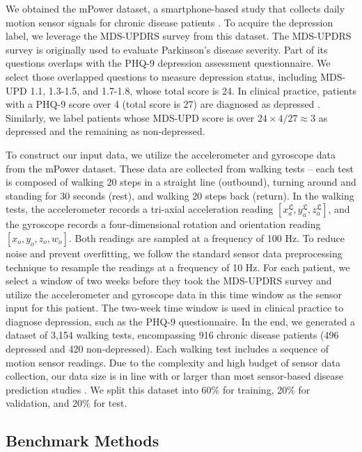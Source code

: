 \documentclass[mnsc]{informs3b} %
\begin{document}
We obtained the mPower dataset, a smartphone-based study that collects daily motion sensor signals for chronic disease patients \citep{bot_mpower_2016}. To acquire the depression label, we leverage the MDS-UPDRS survey from this dataset. The MDS-UPDRS survey is originally used to evaluate Parkinson's disease severity. Part of its questions overlaps with the PHQ-9 depression assessment questionnaire. We select those overlapped questions to measure depression status, including MDS-UPD 1.1, 1.3-1.5, and 1.7-1.8, whose total score is 24. In clinical practice, patients with a PHQ-9 score over 4 (total score is 27) are diagnosed as depressed \citep{patient_phq-9_2022}. Similarly, we label patients whose MDS-UPD score is over $24 \times 4/27 \approx 3$ as depressed and the remaining as non-depressed. 

To construct our input data, we utilize the accelerometer and gyroscope data from the mPower dataset. These data are collected from walking tests – each test is composed of walking 20 steps in a straight line (outbound), turning around and standing for 30 seconds (rest), and walking 20 steps back (return). In the walking tests, the accelerometer records a tri-axial acceleration reading $[x_a^\mathfrak{L},y_a^\mathfrak{L},z_a^\mathfrak{L} ]$, and the gyroscope records a four-dimensional rotation and orientation reading $[x_o,y_o,z_o,w_o ]$. Both readings are sampled at a frequency of 100 Hz. To reduce noise and prevent overfitting, we follow the standard sensor data preprocessing technique \citep{sigcha_deep_2020} to resample the readings at a frequency of 10 Hz. For each patient, we select a window of two weeks before they took the MDS-UPDRS survey and utilize the accelerometer and gyroscope data in this time window as the sensor input for this patient. The two-week time window is used in clinical practice to diagnose depression, such as the PHQ-9 questionnaire. In the end, we generated a dataset of 3,154 walking tests, encompassing 916 chronic disease patients (496 depressed and 420 non-depressed). Each walking test includes a sequence of motion sensor readings. Due to the complexity and high budget of sensor data collection, our data size is in line with or larger than most sensor-based disease prediction studies \citep{zhu_deep_2021,jacobson_passive_2020,farhan_behavior_2016,moon_classification_2020,coelln_quantitative_2019}. We split this dataset into 60\% for training, 20\% for validation, and 20\% for test.

\subsection{Benchmark Methods} \label{sec:em_ana:benchmark}
\end{document}
